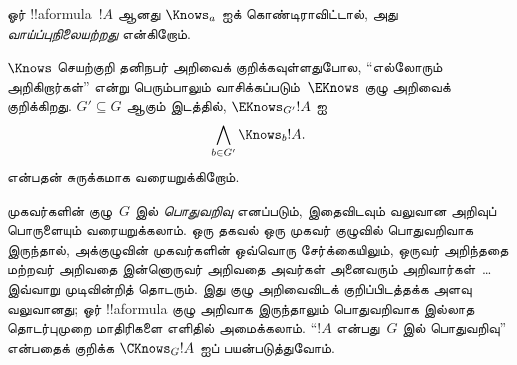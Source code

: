 \documentclass[../../../include/open-logic-section]{subfiles}
\begin{document}
ஓர் !!a{formula}~$!A$ ஆனது $\Knows_a$ ஐக் கொண்டிராவிட்டால், அது
\emph{வாய்ப்புநிலையற்றது} என்கிறோம்.

\begin{defn}
  $\Knows$ செயற்குறி தனிநபர் அறிவைக் குறிக்கவுள்ளதுபோல, ``எல்லோரும்
  அறிகிறார்கள்'' என்று பெரும்பாலும் வாசிக்கப்படும்~$\EKnows$ குழு அறிவைக்
  குறிக்கிறது. $G' \subseteq G$ ஆகும் இடத்தில், $\EKnows_{G'} !A$ ஐ
  \[\bigwedge_{b \in G'} \Knows_b !A.\] என்பதன் சுருக்கமாக வரையறுக்கிறோம்.
\end{defn}

முகவர்களின் குழு~$G$ இல் \emph{பொதுவறிவு} எனப்படும், இதைவிடவும் வலுவான
அறிவுப் பொருளையும் வரையறுக்கலாம். ஒரு தகவல் ஒரு முகவர் குழுவில் பொதுவறிவாக
இருந்தால், அக்குழுவின் முகவர்களின் ஒவ்வொரு சேர்க்கையிலும், ஒருவர் அறிந்ததை
மற்றவர் அறிவதை இன்னொருவர் அறிவதை அவர்கள் அனைவரும் அறிவார்கள்~\dots இவ்வாறு
முடிவின்றித் தொடரும். இது குழு அறிவைவிடக் குறிப்பிடத்தக்க அளவு வலுவானது;
ஓர் !!a{formula} குழு அறிவாக இருந்தாலும் பொதுவறிவாக இல்லாத தொடர்புமுறை
மாதிரிகளை எளிதில் அமைக்கலாம். ``$!A$ என்பது~$G$ இல் பொதுவறிவு'' என்பதைக்
குறிக்க $\CKnows_G !A$ ஐப் பயன்படுத்துவோம்.
\end{document}
